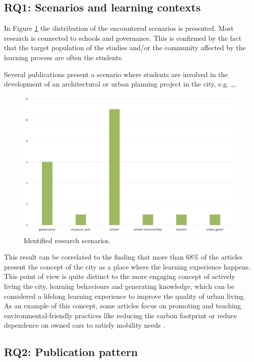 \subsection*{RQ1: Scenarios and learning contexts}

In Figure \ref{fig:scenarios} the distribution of the encountered scenarios is presented. Most research is connected to schools and governance.
This is confirmed by the fact that the target population of the studies and/or the community affected by the learning process are often the students.

Several publications present a scenario where students are involved in the development of an architectural or urban planning project in the city, e.g. \cite{seitamaa-hakkarainen_architecture_2012},\cite{ulrich_lets_2013},\cite{beckett_augmented_2005}.

\begin{figure}[htb]
\centering
\includegraphics[width=12cm]{img/scenario}
\caption{Identified research scenarios.}
\label{fig:scenarios}
\end{figure}

This result can be correlated to the finding that more than 68\% of the articles present the concept of the city as a place where the learning experience happens. This point of view is quite distinct to the more engaging concept of actively living the city, learning behaviours and generating knowledge, which can be considered a lifelong learning experience to improve the quality of urban living.
As an example of this concept, some articles focus on promoting and teaching environmental-friendly practices like reducing the carbon footprint \cite{evans_give_2014} or reduce dependence on owned cars to satisfy mobility needs \cite{valle_cloud_2011}.


\subsection*{RQ2: Publication pattern}

